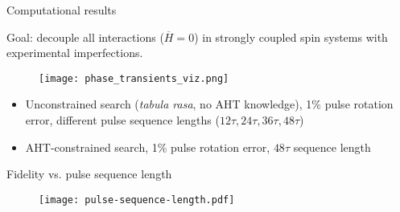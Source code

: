 \documentclass{beamer}
\begin{document}
\begin{frame}{Computational results}


Goal: decouple all interactions (\(\overline{H}=0\)) in strongly coupled spin systems with experimental imperfections.

\begin{figure}
    \centering
    \scalebox{.5}{
    
    }
    \hspace{1em}
    \texttt{[image: phase\_transients\_viz.png]}
\end{figure}

\begin{itemize}
    \item Unconstrained search (\emph{tabula rasa}, no AHT knowledge), 1\% pulse rotation error, different pulse sequence lengths ($12\tau, 24\tau, 36\tau, 48\tau$)
    \item AHT-constrained search, 1\% pulse rotation error, $48\tau$ sequence length
\end{itemize}


\note{


}

\end{frame}

\begin{frame}
{Fidelity vs. pulse sequence length}

\begin{figure}
\centering
\texttt{[image: pulse-sequence-length.pdf]}
\end{figure}


\end{frame}
\end{document}
